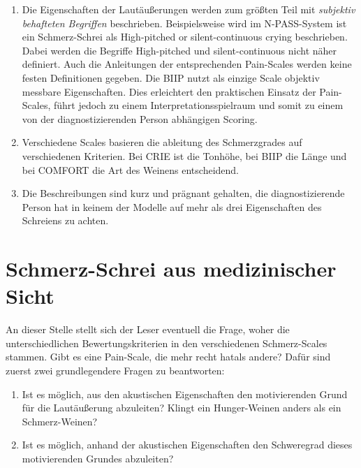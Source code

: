 \begin{enumerate}

\item Die Eigenschaften der Lautäußerungen werden zum größten Teil mit \emph{subjektiv behafteten Begriffen} beschrieben. Beispielsweise wird im N-PASS-System ist ein Schmerz-Schrei als \glqq High-pitched or silent-continuous crying\grqq{} beschrieben. Dabei werden die Begriffe \glqq High-pitched\grqq{} und \glqq silent-continuous\grqq{} nicht näher definiert.  Auch die Anleitungen der entsprechenden Pain-Scales werden keine festen Definitionen gegeben. Die BIIP nutzt als einzige Scale objektiv messbare Eigenschaften. Dies erleichtert den praktischen Einsatz der Pain-Scales, führt jedoch zu einem Interpretationsspielraum und somit zu einem von der diagnostizierenden Person abhängigen Scoring.

\item Verschiedene Scales basieren die ableitung des Schmerzgrades auf verschiedenen Kriterien. Bei CRIE ist die Tonhöhe, bei BIIP die Länge und bei COMFORT die Art des Weinens entscheidend.

\item Die Beschreibungen sind kurz und prägnant gehalten, die diagnostizierende Person hat in keinem der Modelle auf mehr als drei Eigenschaften des Schreiens zu achten.
\end{enumerate}


\section{Schmerz-Schrei aus medizinischer Sicht}

An dieser Stelle stellt sich der Leser eventuell die Frage, woher die unterschiedlichen Bewertungskriterien in den verschiedenen Schmerz-Scales stammen. Gibt es eine Pain-Scale, die \glqq mehr recht hat\grqq  als andere? Dafür sind zuerst zwei grundlegendere Fragen zu beantworten:

\begin{enumerate}
	 \item Ist es möglich, aus den akustischen Eigenschaften den motivierenden Grund für die Lautäußerung abzuleiten?  Klingt ein Hunger-Weinen anders als ein Schmerz-Weinen?
	 \item Ist es möglich, anhand der akustischen Eigenschaften den Schweregrad dieses motivierenden Grundes abzuleiten?
\end{enumerate}

